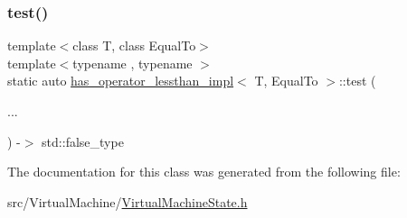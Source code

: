 \mbox{\label{structhas__operator__lessthan__impl_ae64af96a16053f6ded781dda66fc5fb1}} 
\subsubsection{\texorpdfstring{test()}{test()}\hspace{0.1cm}{\footnotesize\ttfamily [2/2]}}
{\footnotesize\ttfamily template$<$class T, class Equal\+To$>$ \\
template$<$typename , typename $>$ \\
static auto \hyperlink{structhas__operator__lessthan__impl}{has\+\_\+operator\+\_\+lessthan\+\_\+impl}$<$ T, Equal\+To $>$\+::test (\begin{DoxyParamCaption}\item[{}]{... }\end{DoxyParamCaption}) -\/$>$  std\+::false\+\_\+type\hspace{0.3cm}{\ttfamily [static]}}



The documentation for this class was generated from the following file\+:\begin{DoxyCompactItemize}
\item 
src/\+Virtual\+Machine/\hyperlink{_virtual_machine_state_8h}{Virtual\+Machine\+State.\+h}\end{DoxyCompactItemize}
